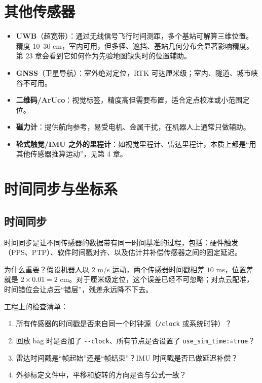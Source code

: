 \section{其他传感器}\label{sec:03-others}

\begin{itemize}
  \item \textbf{UWB}（超宽带）：通过无线信号飞行时间测距，多个基站可解算三维位置。精度 10--30 cm，室内可用，但多径、遮挡、基站几何分布会显著影响精度。第 23 章会看到它如何作为先验地图缺失时的位置辅助。
  \item \textbf{GNSS}（卫星导航）：室外绝对定位，RTK 可达厘米级；室内、隧道、城市峡谷不可用。
  \item \textbf{二维码/ArUco}：视觉标签，精度高但需要布置，适合定点校准或小范围定位。
  \item \textbf{磁力计}：提供航向参考，易受电机、金属干扰，在机器人上通常只做辅助。
  \item \textbf{轮式触觉/IMU 之外的里程计}：如视觉里程计、雷达里程计，本质上都是“用其他传感器推算运动”，见第 4 章。
\end{itemize}

\section{时间同步与坐标系}\label{sec:03-sync}

\subsection{时间同步}

\begin{definition}[时间同步]
时间同步是让不同传感器的数据带有同一时间基准的过程，包括：硬件触发（PPS、PTP）、软件时间戳对齐、以及估计并补偿传感器之间的固定延迟。
\end{definition}

为什么重要？假设机器人以 $2$ m/s 运动，两个传感器时间戳相差 $10$ ms，位置差就是 $2\times0.01=2$ cm。对于厘米级定位，这个误差已经不可忽略；对点云配准，时间错位会让点云“错层”，残差永远降不下去。

工程上的检查清单：
\begin{enumerate}
  \item 所有传感器的时间戳是否来自同一个时钟源（\lstinline{/clock} 或系统时钟）？
  \item 回放 bag 时是否加了 \lstinline{--clock}、所有节点是否设置了 \lstinline{use_sim_time:=true}？
  \item 雷达时间戳是“帧起始”还是“帧结束”？IMU 时间戳是否已做延迟补偿？
  \item 外参标定文件中，平移和旋转的方向是否与公式一致？
\end{enumerate}

